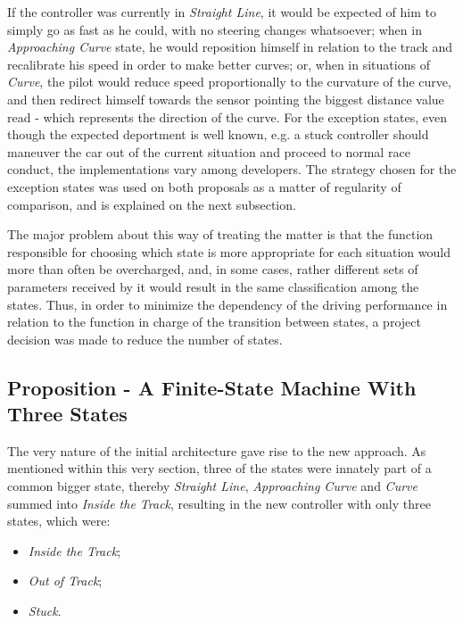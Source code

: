 	If the controller was currently in \emph{Straight Line}, it would be expected of him to simply go as fast as he
	could, with no steering changes whatsoever; when in \emph{Approaching Curve} state, he would reposition himself
	in relation to the track and recalibrate his speed in order to make better curves; or, when in situations of
	\emph{Curve}, the pilot would reduce speed proportionally to the curvature of the curve, and then redirect
	himself towards the sensor pointing the biggest distance value read - which represents the direction of the curve.
	For the exception states, even though the expected deportment is well known, e.g. a stuck controller should
	maneuver the car out of the current situation and proceed to normal race conduct, the implementations vary among
	developers. The strategy chosen for the exception states was used on both proposals as a matter of regularity of
	comparison, and is explained on the next subsection.
	
	The major problem about this way of treating the matter is that the function responsible for choosing which state
	is more appropriate for each situation would more than often be overcharged, and, in some cases, rather different
	sets of parameters received by it would result in the same classification among the states. Thus, in order to
	minimize the dependency of the driving performance in relation to the function in charge of the transition
	between states, a project decision was made to reduce the number of states.
		
	\subsection{Proposition - A Finite-State Machine With Three States}
	
	The very nature of the initial architecture gave rise to the new approach. As mentioned within this very section,
	three of the states were innately part of a common bigger state, thereby \emph{Straight Line},
	\emph{Approaching Curve} and \emph{Curve} summed into \emph{Inside the Track}, resulting in the new controller
	with only three states, which were:
	
	\begin{itemize}
		
		\item \emph{Inside the Track};
		\item \emph{Out of Track};
		\item \emph{Stuck}.
		
	\end{itemize}
	
